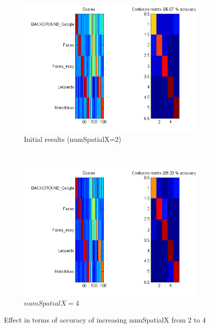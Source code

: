 \begin{figure}[htb]
	\centering
	\begin{subfigure}[t]{0.4\textwidth}
		\includegraphics[width=\textwidth]{./img/ex1/eval-initial.png}
		\caption{Initial results (numSpatialX=2)}
	\end{subfigure}
	~
	\begin{subfigure}[t]{0.4\textwidth}
		\includegraphics[width=\textwidth]{./img/ex1/eval-numSpatialX-4.png}
		\caption{$ numSpatialX=4 $}
	\end{subfigure}
	
\caption{Effect in terms of accuracy of increasing numSpatialX from 2 to 4}
\label{fig:effect-size-numSpatialX}
\end{figure}

